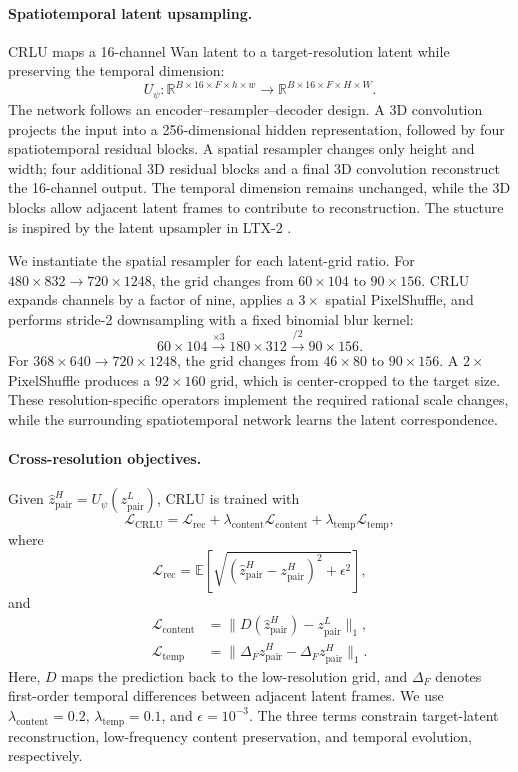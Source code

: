 \paragraph{Spatiotemporal latent upsampling.}
CRLU maps a 16-channel Wan latent to a target-resolution latent while
preserving the temporal dimension:
\[
U_\psi:
\mathbb R^{B\times16\times F\times h\times w}
\rightarrow
\mathbb R^{B\times16\times F\times H\times W}.
\]
The network follows an
encoder--resampler--decoder design. A 3D convolution projects the input into a
256-dimensional hidden representation, followed by four spatiotemporal
residual blocks. A spatial resampler changes only height and width; four
additional 3D residual blocks and a final 3D convolution reconstruct the
16-channel output. The temporal dimension remains unchanged, while the 3D
blocks allow adjacent latent frames to contribute to reconstruction. The stucture is inspired by the latent upsampler in LTX-2
\citep{hacohen2026ltx2}.

We instantiate the spatial resampler for each latent-grid ratio. For
\(480\times832\rightarrow720\times1248\), the grid changes from
\(60\times104\) to \(90\times156\). CRLU expands channels by a factor of
nine, applies a \(3\times\) spatial PixelShuffle, and performs stride-2
downsampling with a fixed binomial blur kernel:
\[
60\times104
\xrightarrow{\times3}
180\times312
\xrightarrow{/2}
90\times156.
\]
For \(368\times640\rightarrow720\times1248\), the grid changes from
\(46\times80\) to \(90\times156\). A \(2\times\) PixelShuffle produces a
\(92\times160\) grid, which is center-cropped to the target size. These
resolution-specific operators implement the required rational scale changes,
while the surrounding spatiotemporal network learns the latent correspondence.

\paragraph{Cross-resolution objectives.}
Given
\(\widehat z_{\mathrm{pair}}^H=U_\psi(z_{\mathrm{pair}}^L)\), CRLU is trained
with
\[
\mathcal L_{\mathrm{CRLU}}
=
\mathcal L_{\mathrm{rec}}
+\lambda_{\mathrm{content}}\mathcal L_{\mathrm{content}}
+\lambda_{\mathrm{temp}}\mathcal L_{\mathrm{temp}},
\]
where
\[
\mathcal L_{\mathrm{rec}}
=
\mathbb E\!\left[
\sqrt{(\widehat z_{\mathrm{pair}}^H-z_{\mathrm{pair}}^H)^2+\epsilon^2}
\right],
\]
and
\begin{align}
\mathcal L_{\mathrm{content}}
&=\lVert D(\widehat z_{\mathrm{pair}}^H)-z_{\mathrm{pair}}^L\rVert_1,\\
\mathcal L_{\mathrm{temp}}
&=\lVert\Delta_F\widehat z_{\mathrm{pair}}^H-
\Delta_Fz_{\mathrm{pair}}^H\rVert_1.
\end{align}
Here, \(D\) maps the prediction back to the low-resolution grid, and
\(\Delta_F\) denotes first-order temporal differences between adjacent latent
frames. We use \(\lambda_{\mathrm{content}}=0.2\),
\(\lambda_{\mathrm{temp}}=0.1\), and \(\epsilon=10^{-3}\). The three terms
constrain target-latent reconstruction, low-frequency content preservation,
and temporal evolution, respectively.

